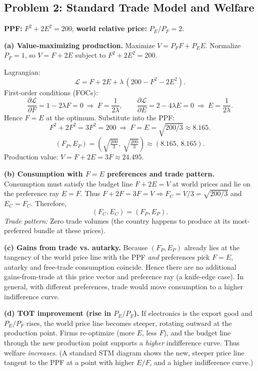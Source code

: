 \documentclass[12pt]{article}
\begin{document}
\bigskip

\subsection*{Problem 2: Standard Trade Model and Welfare}

\textbf{PPF:} $F^2+2E^2=200$; \textbf{world relative price:} $P_E/P_F=2$.

\medskip
\textbf{(a) Value-maximizing production.} Maximize $V=P_F F+P_E E$. Normalize $P_F=1$, so $V=F+2E$ subject to $F^2+2E^2=200$.

Lagrangian:
\[
\mathcal{L}=F+2E+\lambda\,(200-F^2-2E^2).
\]
First-order conditions (FOCs):
\[
\frac{\partial \mathcal{L}}{\partial F}=1-2\lambda F=0 \ \Rightarrow\ F=\frac{1}{2\lambda},\qquad
\frac{\partial \mathcal{L}}{\partial E}=2-4\lambda E=0 \ \Rightarrow\ E=\frac{1}{2\lambda}.
\]
Hence $F=E$ at the optimum. Substitute into the PPF:
\[
F^2+2F^2=3F^2=200 \ \Rightarrow\ F=E=\sqrt{200/3}\approx 8.165.
\]
\[
\boxed{(F_P,E_P)=\left(\sqrt{\tfrac{200}{3}},\ \sqrt{\tfrac{200}{3}}\right)\approx(8.165,\,8.165)}.
\]
Production value: $V=F+2E=3F\approx 24.495$.

\medskip
\textbf{(b) Consumption with $F=E$ preferences and trade pattern.} Consumption must satisfy the budget line $F+2E=V$ at world prices and lie on the preference ray $E=F$. Thus $F+2F=3F=V \Rightarrow F_C=V/3=\sqrt{200/3}$ and $E_C=F_C$. Therefore,
\[
\boxed{(F_C,E_C)=(F_P,E_P)}.
\]
\emph{Trade pattern:} Zero trade volumes (the country happens to produce at its most-preferred bundle at these prices).

\medskip
\textbf{(c) Gains from trade vs. autarky.} Because $(F_P,E_P)$ already lies at the tangency of the world price line with the PPF \emph{and} preferences pick $F=E$, autarky and free-trade consumption coincide. Hence there are no additional gains-from-trade at this price vector and preference ray (a knife-edge case). In general, with different preferences, trade would move consumption to a higher indifference curve.

\medskip
\textbf{(d) TOT improvement (rise in $P_E/P_F$).} If electronics is the export good and $P_E/P_F$ rises, the world price line becomes steeper, rotating outward at the production point. Firms re-optimize (more $E$, less $F$), and the budget line through the new production point supports a \emph{higher} indifference curve. Thus welfare \emph{increases}. (A standard STM diagram shows the new, steeper price line tangent to the PPF at a point with higher $E/F$, and a higher indifference curve.)
\end{document}
